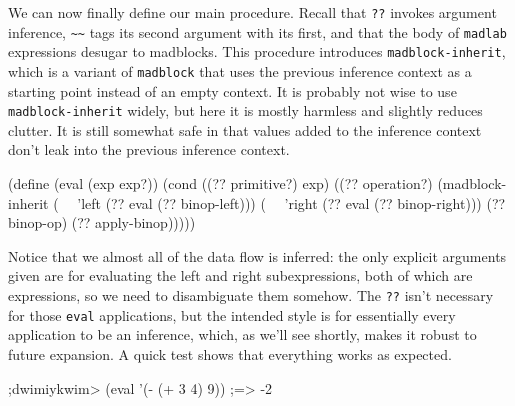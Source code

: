 \documentclass[11pt]{article}
\begin{document}
We can now finally define our main procedure.
Recall that \texttt{??} invokes argument inference,
\verb|~~| tags its second argument with its first,
and that the body of \texttt{madlab} expressions
desugar to madblocks.
This procedure introduces \texttt{madblock-inherit},
which is a variant of \texttt{madblock} that
uses the previous inference context as a starting point
instead of an empty context.
It is probably not wise to use \texttt{madblock-inherit} widely,
but here it is mostly harmless and slightly reduces clutter.
It is still somewhat safe in that values added to the inference context
don't leak into the previous inference context.
\begin{verbbox}
(define (eval (exp exp?))
  (cond
   ((?? primitive?)
    exp)
   ((?? operation?)
    (madblock-inherit
     (~~ 'left (?? eval (?? binop-left)))
     (~~ 'right (?? eval (?? binop-right)))
     (?? binop-op)
     (?? apply-binop)))))
\end{verbbox}
\begin{quote}\theverbbox\end{quote}
Notice that we almost all of the data flow is inferred:
the only explicit arguments given are for evaluating
the left and right subexpressions,
both of which are expressions, so we need to disambiguate them somehow.
The \texttt{??} isn't necessary for those \texttt{eval} applications,
but the intended style is for essentially every application
to be an inference,
which, as we'll see shortly, makes it robust to future expansion.
A quick test shows that everything works as expected.
\begin{verbbox}
;dwimiykwim>
(eval '(- (+ 3 4) 9))
;=> -2
\end{verbbox}
\begin{quote}\theverbbox\end{quote}
\end{document}
